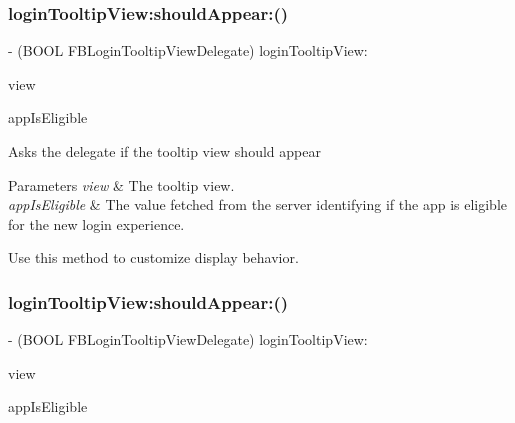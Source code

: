 \subsubsection{\texorpdfstring{login\+Tooltip\+View\+:should\+Appear\+:()}{loginTooltipView:shouldAppear:()}\hspace{0.1cm}{\footnotesize\ttfamily [2/5]}}
{\footnotesize\ttfamily -\/ (B\+O\+OL F\+B\+Login\+Tooltip\+View\+Delegate) login\+Tooltip\+View\+: \begin{DoxyParamCaption}\item[{(\hyperlink{interfaceFBLoginTooltipView}{F\+B\+Login\+Tooltip\+View} $\ast$)}]{view }\item[{shouldAppear:(B\+O\+OL)}]{app\+Is\+Eligible }\end{DoxyParamCaption}\hspace{0.3cm}{\ttfamily [optional]}}

Asks the delegate if the tooltip view should appear


\begin{DoxyParams}{Parameters}
{\em view} & The tooltip view. \\
\hline
{\em app\+Is\+Eligible} & The value fetched from the server identifying if the app is eligible for the new login experience.\\
\hline
\end{DoxyParams}
Use this method to customize display behavior. \mbox{\label{protocolFBLoginTooltipViewDelegate_01-p_a0b9d5ac15bf779f27017b5f8a7a32450}} 
\subsubsection{\texorpdfstring{login\+Tooltip\+View\+:should\+Appear\+:()}{loginTooltipView:shouldAppear:()}\hspace{0.1cm}{\footnotesize\ttfamily [3/5]}}
{\footnotesize\ttfamily -\/ (B\+O\+OL F\+B\+Login\+Tooltip\+View\+Delegate) login\+Tooltip\+View\+: \begin{DoxyParamCaption}\item[{(\hyperlink{interfaceFBLoginTooltipView}{F\+B\+Login\+Tooltip\+View} $\ast$)}]{view }\item[{shouldAppear:(B\+O\+OL)}]{app\+Is\+Eligible }\end{DoxyParamCaption}\hspace{0.3cm}{\ttfamily [optional]}}

